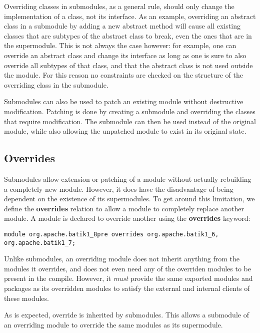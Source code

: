 Overriding classes in submodules, as a general rule, should only change the implementation 
of a class, not its interface. As an example, overriding an abstract class in a submodule by adding
a new abstract method will cause all existing classes that are subtypes of the 
abstract class to break, even the ones that are in the supermodule. This is not always
the case however: for example, one can override an abstract class and change its interface
as long as one is sure to also override all subtypes of that class, and that the
abstract class is not used outside the module. For this reason no constraints are checked
on the structure of the overriding class in the submodule.

Submodules can also be used to patch an existing module without
destructive modification. Patching is done by creating a submodule
and overriding the classes that require modification. The submodule can
then be used instead of the original module, while also allowing the
unpatched module to exist in its original state.

\subsection{Overrides}

Submodules allow extension or patching of a module without actually
rebuilding a completely new module. However, it does have the disadvantage
of being dependent on the existence of its supermodules. To get
around this limitation, we define the \textbf{overrides} relation to allow
a module to completely replace another module. A module is declared
to override another using the \textbf{overrides} keyword:

\begin{lstlisting}
module org.apache.batik1_8pre overrides org.apache.batik1_6, org.apache.batik1_7;
\end{lstlisting}

Unlike submodules, an overriding module does not inherit anything from the
modules it overrides, and does not even need any of the overriden modules to
be present in the compile. However, it \textit{must} provide the same exported modules
and packages as its overridden modules to satisfy the external and internal
clients of these modules. 

As is expected, override is inherited by submodules. This allows a submodule
of an overriding module to override the same modules as its supermodule.

